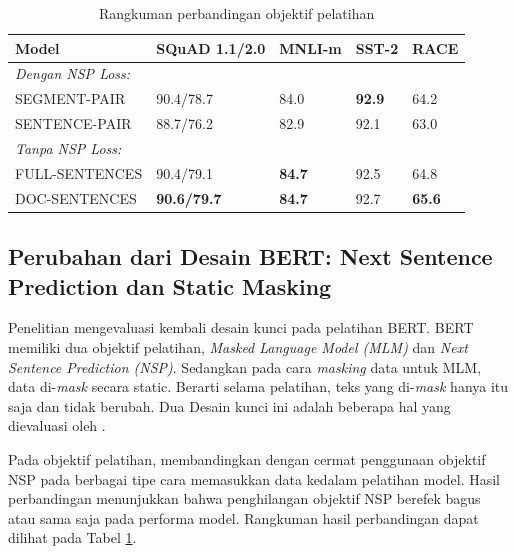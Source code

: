         \begin{table}[tb]
            \centering
            \caption{Rangkuman perbandingan objektif pelatihan \parencite{Liu_Ott_Goyal_Du_Joshi_Chen_Levy_Lewis_Zettlemoyer_Stoyanov_2019} }
            \begin{tabular}{|l|l|l|l|l|}
                \hline
                \textbf{Model} & \textbf{SQuAD 1.1/2.0} & \textbf{MNLI-m} & \textbf{SST-2} & \textbf{RACE} \\ \hline
                \multicolumn{5}{|l|}{\textit{Dengan NSP Loss:}}                                            \\ \hline
                SEGMENT-PAIR   & 90.4/78.7              & 84.0            & \textbf{92.9}  & 64.2          \\ \hline
                SENTENCE-PAIR  & 88.7/76.2              & 82.9            & 92.1           & 63.0          \\ \hline
                \multicolumn{5}{|l|}{\textit{Tanpa NSP Loss:}}                                             \\ \hline
                FULL-SENTENCES & 90.4/79.1              & \textbf{84.7}   & 92.5           & 64.8          \\ \hline
                DOC-SENTENCES  & \textbf{90.6/79.7}     & \textbf{84.7}   & 92.7           & \textbf{65.6} \\ \hline
            \end{tabular}
            \label{tab:rangkuman_roberta_1}
        \end{table}

        \subsection{Perubahan dari Desain BERT: Next Sentence Prediction dan Static Masking}
        Penelitian \parencite{Liu_Ott_Goyal_Du_Joshi_Chen_Levy_Lewis_Zettlemoyer_Stoyanov_2019} mengevaluasi kembali desain kunci pada pelatihan BERT. BERT memiliki dua objektif pelatihan, \textit{Masked Language Model (MLM)} dan \textit{Next Sentence Prediction (NSP)}. Sedangkan pada cara \textit{masking} data untuk MLM, data di-\textit{mask} secara static. Berarti selama pelatihan, teks yang di-\textit{mask} hanya itu saja dan tidak berubah. Dua Desain kunci ini adalah beberapa hal yang dievaluasi oleh \parencite{Liu_Ott_Goyal_Du_Joshi_Chen_Levy_Lewis_Zettlemoyer_Stoyanov_2019}.

        Pada objektif pelatihan, \parencite{Liu_Ott_Goyal_Du_Joshi_Chen_Levy_Lewis_Zettlemoyer_Stoyanov_2019} membandingkan dengan cermat penggunaan objektif NSP pada berbagai tipe cara memasukkan data kedalam pelatihan model. Hasil perbandingan menunjukkan bahwa penghilangan objektif NSP berefek bagus atau sama saja pada performa model. Rangkuman hasil perbandingan dapat dilihat pada Tabel \ref{tab:rangkuman_roberta_1}.

